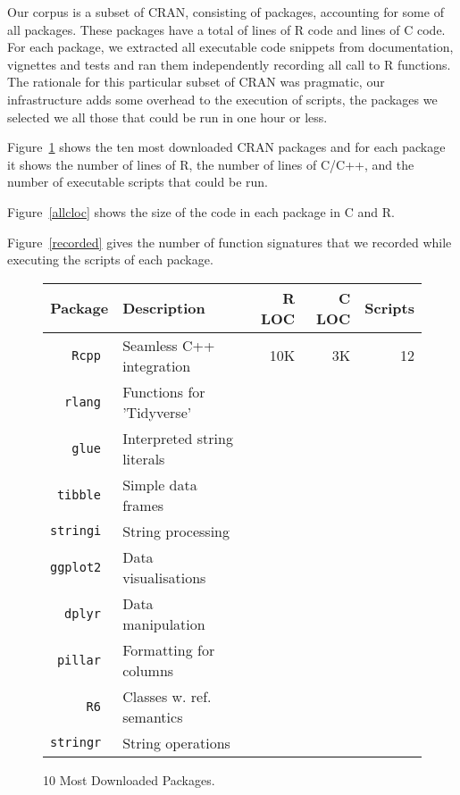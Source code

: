 \documentclass[acmsmall,10pt,review,anonymous]{acmart}\settopmatter{printfolios=true,printccs=false,printacmref=false}
\begin{document}
Our corpus is a subset of CRAN, consisting of \PACKAGES packages, accounting
for some \PERCENTCRAN of all packages.  These packages have a total of \RLOC
lines of R code and \CLOC lines of C code. For each package, we extracted all
executable code snippets from documentation, vignettes and tests and ran
them independently recording all call to R functions.  The rationale for
this particular subset of CRAN was pragmatic, our infrastructure adds some
overhead to the execution of scripts, the packages we selected we all those
that could be run in one hour or less.

Figure~\ref{most} shows the ten most downloaded CRAN packages
and for each package it shows the number of lines of R, the number of lines
of C/C++, and the number of executable scripts that could be run.

Figure~\ref{allcloc} shows the size of the code in each package in C and R.

Figure~\ref{recorded} gives the number of function signatures that we
recorded while executing the scripts of each package.

\begin{figure}[!th]
  {\footnotesize\begin{tabular}{@{}r||l|r|r|r@{}}
\hline
\bf Package & \bf Description & \bf R LOC &\bf C LOC &\bf Scripts\\\hline
\tt Rcpp  & Seamless C++ integration & 10K & 3K & 12 \\
\tt rlang & Functions for 'Tidyverse'&&& \\
\tt glue  & Interpreted string literals&&& \\
\tt tibble & Simple data frames&& &\\
\tt stringi &  String processing &&& \\
\tt ggplot2 & Data visualisations&& &\\
\tt dplyr  &  Data manipulation&&& \\
\tt pillar & Formatting for columns&&& \\
\tt R6 & Classes w. ref. semantics&&& \\
\tt stringr & String operations&&& \\
\end{tabular}}
\caption{10 Most Downloaded Packages.}\label{most}
\end{figure}
\end{document}
